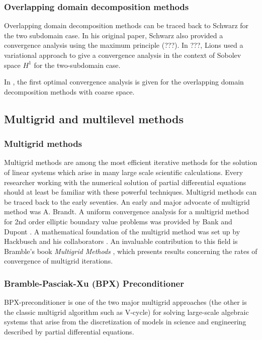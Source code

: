\documentclass[CJK,11pt]{amsart}
\theoremstyle{definition}
\begin{document}
\begin{CJK*}{UTF8}{gbsn}
\subsubsection{Overlapping domain decomposition methods}
Overlapping domain decomposition methods can be traced back to Schwarz
\cite{} for the two subdomain case.  In his original paper, Schwarz
also provided a convergence analysis using the maximum principle (???).
In ???, Lions used a variational approach to give a convergence
analysis in the context of Sobolev space $H^1$ for the two-subdomain
case.


In \cite{bramble1991convergence-b}, the first optimal convergence
analysis is given for the overlapping domain decomposition methods
with coarse space.

\subsection{Multigrid and multilevel methods}

\subsubsection{Multigrid methods}  Multigrid methods are among the most efficient iterative methods for
the solution of linear systems which arise in many large scale
scientific calculations. Every researcher working with the numerical
solution of partial differential equations should at least be familiar
with these powerful techniques. Multigrid methods can be traced back to
the early seventies.  An early and major advocate of multigrid
method was A. Brandt.   A uniform convergence analysis for
a multigrid method for 2nd order elliptic boundary value problems was
provided by Bank and Dupont \cite{}.  A mathematical foundation of the multigrid method
was set up by Hackbusch and his collaborators \cite{}. An invaluable contribution
to this field is Bramble's book {\it Multigrid Methods} \cite{bramble2019multigrid}, which 
presents results concerning the rates of convergence of multigrid
iterations.

\subsubsection{Bramble-Pasciak-Xu (BPX) Preconditioner}
BPX-preconditioner \cite{bramble1990parallel}  is one of the two major multigrid approaches (the other is the classic multigrid algorithm such as V-cycle) for solving large-scale algebraic systems that arise from the discretization of models in science and engineering described by partial differential equations. 


\end{CJK*}
\end{document}
